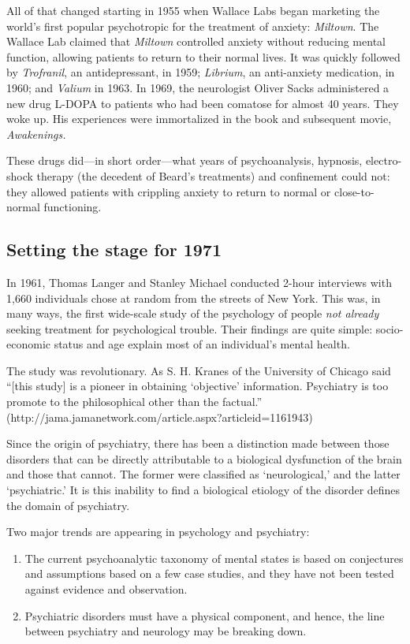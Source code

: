 All of that changed starting in 1955 when Wallace Labs began marketing the world's first popular psychotropic for the treatment of anxiety: \emph{Miltown}. The Wallace Lab claimed that \emph{Miltown} controlled anxiety without reducing mental function, allowing patients to return to their normal lives. It was quickly followed by \emph{Trofranil}, an antidepressant, in 1959; \emph{Librium}, an anti-anxiety medication, in 1960; and \emph{Valium} in 1963. In 1969, the neurologist Oliver Sacks administered a new drug L-DOPA to patients who had been comatose for almost 40 years. They woke up. His experiences were immortalized in the book and subsequent movie, \emph{Awakenings.}

These drugs did—in short order—what years of psychoanalysis, hypnosis, electro-shock therapy (the decedent of Beard's treatments) and confinement could not: they allowed patients with crippling anxiety to return to normal or close-to-normal functioning.

\subsection{Setting the stage for 1971}
\label{settingthestagefor1971}

In 1961, Thomas Langer and Stanley Michael conducted 2-hour interviews with 1,660 individuals chose at random from the streets of New York. This was, in many ways, the first wide-scale study of the psychology of people \emph{not already} seeking treatment for psychological trouble. Their findings are quite simple: socio-economic status and age explain most of an individual's mental health. 

The study was revolutionary. As S. H. Kranes of the University of Chicago said ``[this study] is a pioneer in obtaining `objective' information. Psychiatry is too promote to the philosophical other than the factual.'' (http:\slash \slash jama.jamanetwork.com\slash article.aspx?articleid=1161943)

Since the origin of psychiatry, there has been a distinction made between those disorders that can be directly attributable to a biological dysfunction of the brain and those that cannot. The former were classified as `neurological,' and the latter `psychiatric.' It is this inability to find a biological etiology of the disorder defines the domain of psychiatry.

Two major trends are appearing in psychology and psychiatry: 

\begin{enumerate}
\item The current psychoanalytic taxonomy of mental states is based on conjectures and assumptions based on a few case studies, and they have not been tested against evidence and observation.

\item Psychiatric disorders must have a physical component, and hence, the line between psychiatry and neurology may be breaking down.

\end{enumerate}

